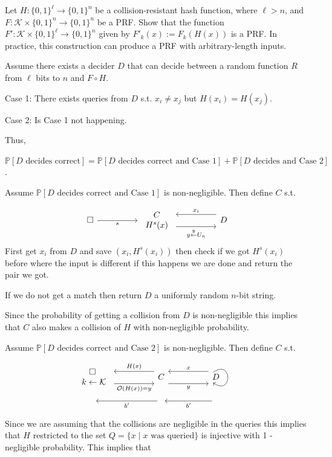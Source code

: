 \documentclass[12pt, letterpaper]{article}
\renewcommand{\P}{\mathbb{P}}
\renewcommand{\t}[1]{\text{#1}}
\newcommand{\bit}{{\{0,1\}}}
\begin{document}
\begin{problem}{}
    Let $H\colon \bit^\ell \to \bit^n$ be a collision-resistant hash function,
    where $\ell > n$, and $F\colon \mathcal{K} \times \bit^n \to \bit^n$ be a PRF.
    Show that the function $F'\colon \mathcal{K} \times \bit^\ell \to \bit^n$
    given by $F'_k(x) := F_k(H(x))$ is a PRF.  In practice, this construction
    can produce a PRF with arbitrary-length inputs.
\end{problem}
\begin{problemproof}
    Assume there exists a decider $D$ that can decide between a random function $R$ from $\ell$ bits to $n$ and $F \circ H$.

    Case 1: There exists queries from $D$ s.t. $x_i \neq x_j$ but $H(x_i)=H(x_j)$.

    Case 2: Is Case 1 not happening.

    Thus, 
    
    $\P[D \t{ decides correct}] = \P[D \t{ decides correct and Case 1}] + \P[D \t{ decides and Case 2}]$.

    Assume $\P[D \t{ decides correct and Case 1}]$ is non-negligible. Then define $C$ s.t.

    \[\begin{tikzcd}
	\square && \begin{array}{c} C\\ H^s(x) \end{array} && D
	\arrow["s"', from=1-1, to=1-3]
	\arrow["{y \overset{\$}{\leftarrow}U_n}"', shift right=3, from=1-3, to=1-5]
	\arrow["{x_i}"', shift right=3, from=1-5, to=1-3] \end{tikzcd}\]
    First get $x_i$ from $D$ and save $(x_i, H^s(x_i))$ then check
    if we got $H^s(x_i)$ before where the input is different if this happens we are done and return the pair we got.

    If we do not get a match then return $D$ a uniformly random $n$-bit string.

    Since the probability of getting a collision from $D$ is non-negligible this implies that $C$ also makes a collision of $H$ with non-negligible probability.

    Assume $\P[D \t{ decides correct and Case 2}]$ is non-negligible. Then define $C$ s.t.
    \[\begin{tikzcd}
	\begin{array}{c} \square\\\ k \leftarrow \mathcal{K} \end{array} && C && {D} \\
	{} && {} && {}
	\arrow["{\mathcal{O}(H(x))=y}"', shift right=3, from=1-1, to=1-3]
	\arrow["{H(x)}"', shift right=3, from=1-3, to=1-1]
	\arrow["y"', shift right=3, from=1-3, to=1-5]
	\arrow["x"', shift right=3, from=1-5, to=1-3]
	\arrow[shift right=5, from=1-5, to=1-5, loop, in=325, out=35, distance=10mm]
	\arrow["{b'}", shift right=3, from=2-3, to=2-1]
	\arrow["{b'}", shift right=3, from=2-5, to=2-3]
    \end{tikzcd}\]
    Since we are assuming that the collisions are negligible in the queries this implies that $H$ restricted to the set $Q = \{x \mid x \t{ was queried}\}$ is injective with 1 - negligible probability. This implies that


\end{problemproof}
\end{document}
